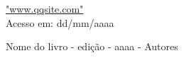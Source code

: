 \begin{thebibliography}{}
 \begin{flushleft}
	\url{"www.qqsite.com"}\\ Acesso em: dd/mm/aaaa
\end{flushleft}
\begin{flushleft}
	Nome do livro - edição - aaaa - Autores\\
\end{flushleft}
\end{thebibliography}